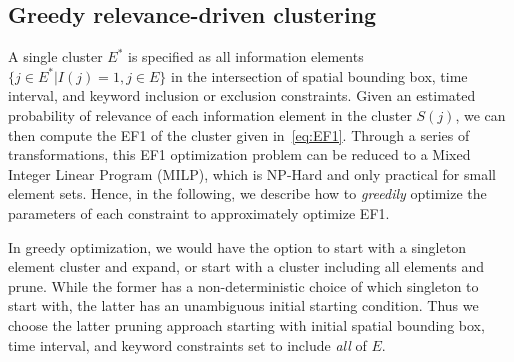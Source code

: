 



\subsection{Greedy relevance-driven clustering}


A single cluster $E^*$ is specified as all information elements $\{j \in E^* | I(j)=1, j \in E \}$ in the intersection of spatial bounding box, time interval, and keyword inclusion or exclusion constraints.  Given an estimated probability of relevance of each information element in the cluster $S(j)$, we can then compute the EF1 of the cluster given in~\eqref{eq:EF1}.  Through a series of transformations, this EF1 optimization problem can be reduced to a Mixed Integer Linear Program (MILP), which is NP-Hard and only practical for small element sets.  Hence, in the following, we describe how to \emph{greedily} optimize the parameters of each constraint to approximately optimize EF1.

In greedy optimization, we would have the option to start with a singleton element cluster and expand, or start with a cluster including all elements and prune.  While the former has a non-deterministic choice of which singleton to start with, the latter has an unambiguous initial starting condition.  Thus we choose the latter pruning approach starting with initial spatial bounding box, time interval, and keyword constraints set to include \emph{all} of $E$.  


